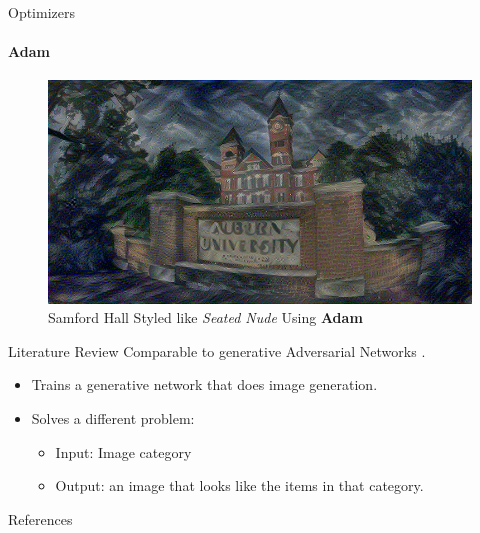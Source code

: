 \documentclass{beamer}
\begin{document}
\begin{frame}{Optimizers}
\framesubtitle{Adam}
\begin{figure}[ht]
\centering
\includegraphics[width=\textwidth]{img/loss/Adam}
\caption*{Samford Hall Styled like \textit{Seated Nude} Using \textbf{Adam}}
\end{figure}
\end{frame}



\begin{frame}{Literature Review}
    Comparable to generative Adversarial
    Networks \cite{dosovitskiy2016generating}.
    \begin{itemize}
        \item Trains a generative network
            that does image generation.
        \item Solves a different problem:
            \begin{itemize}
                \item[] Input: Image category
                \item[] Output: an image that looks like
            the items in that category.
            \end{itemize}
    \end{itemize}
\end{frame}



\begin{frame}[allowframebreaks]{References}
    
    
\end{frame}
\end{document}

